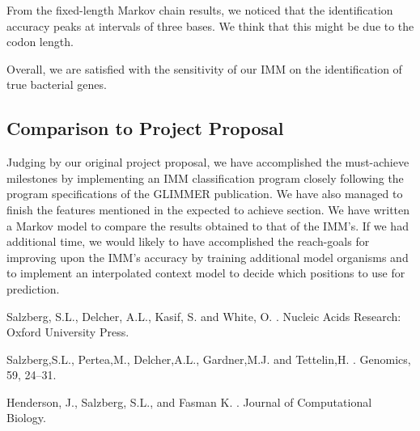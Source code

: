 \documentclass[11pt,letterpaper]{article}
\begin{document}
From the fixed-length Markov chain results, we noticed that the identification accuracy peaks at intervals of three bases. We think that this might be due to the codon length. 

Overall, we are satisfied with the sensitivity of our IMM on the identification of true bacterial genes.

\subsection{Comparison to Project Proposal}
Judging by our original project proposal, we have accomplished the must-achieve milestones by implementing an IMM classification program closely following the program specifications of the GLIMMER publication. We have also managed to finish the features mentioned in the expected to achieve section. We have written a Markov model to compare the results obtained to that of the IMM’s. If we had additional time, we would likely to have accomplished the reach-goals for improving upon the IMM’s accuracy by training additional model organisms and to implement an interpolated context model to decide which positions to use for prediction.


\begin{thebibliography}{}

Salzberg, S.L., Delcher, A.L., Kasif, S. and White, O.
.
\newblock Nucleic Acids Research: Oxford University Press.

Salzberg,S.L., Pertea,M., Delcher,A.L., Gardner,M.J. and
Tettelin,H.
.
\newblock Genomics, 59, 24–31.

Henderson, J., Salzberg, S.L., and Fasman K.
.
\newblock Journal of Computational Biology.

\end{thebibliography}
\end{document}
